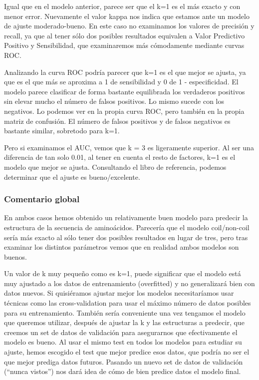 \documentclass[
]{article}
\begin{document}
Igual que en el modelo anterior, parece ser que el k=1 es el más exacto
y con menor error. Nuevamente el valor kappa nos indica que estamos ante
un modelo de ajuste moderado-bueno. En este caso no examinamos los
valores de precisión y recall, ya que al tener sólo dos posibles
resultados equivalen a Valor Predictivo Positivo y Sensibilidad, que
examinaremos más cómodamente mediante curvas ROC.

Analizando la curva ROC podría parecer que k=1 es el que mejor se
ajusta, ya que es el que más se aproxima a 1 de sensibilidad y 0 de 1 -
especificidad. El modelo parece clasificar de forma bastante equilibrada
los verdaderos positivos sin elevar mucho el número de falsos positivos.
Lo mismo sucede con los negativos. Lo podemos ver en la propia curva
ROC, pero también en la propia matriz de confusión. El número de falsos
positivos y de falsos negativos es bastante similar, sobretodo para k=1.

Pero si examinamos el AUC, vemos que k = 3 es ligeramente superior. Al
ser una diferencia de tan solo 0.01, al tener en cuenta el resto de
factores, k=1 es el modelo que mejor se ajusta. Consultando el libro de
referencia, podemos determinar que el ajuste es bueno/excelente.

\hypertarget{comentario-global}{%
\subsubsection{Comentario global}\label{comentario-global}}

En ambos casos hemos obtenido un relativamente buen modelo para predecir
la estructura de la secuencia de aminoácidos. Parecería que el modelo
coil/non-coil sería más exacto al sólo tener dos posibles resultados en
lugar de tres, pero tras examinar los distintos parámetros vemos que en
realidad ambos modelos son buenos.

Un valor de k muy pequeño como es k=1, puede significar que el modelo
está muy ajustado a los datos de entrenamiento (overfitted) y no
generalizará bien con datos nuevos. Si quisiéramos ajustar mejor los
modelos necesitaríamos usar técnicas como las cross-validation para usar
el máximo número de datos posibles para su entrenamiento. También sería
conveniente una vez tengamos el modelo que queremos utilizar, después de
ajustar la k y las estructuras a predecir, que creemos un set de datos
de validación para asegurarnos que efectivamente el modelo es bueno. Al
usar el mismo test en todos los modelos para estudiar su ajuste, hemos
escogido el test que mejor predice esos datos, que podría no ser el que
mejor prediga datos futuros. Pasando un nuevo set de datos de validación
(``nunca vistos'') nos dará idea de cómo de bien predice datos el modelo
final.
\end{document}
